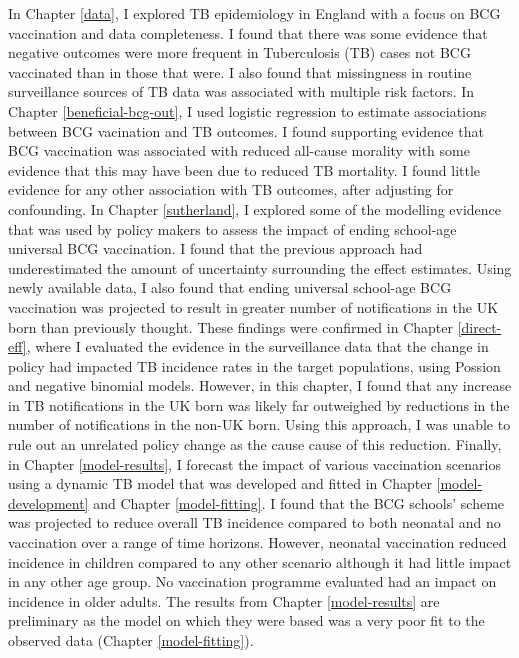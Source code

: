 \documentclass[11pt,twoside]{bristolthesis}
\begin{document}
  In Chapter \ref{data}, I explored TB epidemiology in England with a focus on BCG vaccination and data completeness. I found that there was some evidence that negative outcomes were more frequent in Tuberculosis (TB) cases not BCG vaccinated than in those that were. I also found that missingness in routine surveillance sources of TB data was associated with multiple risk factors. In Chapter \ref{beneficial-bcg-out}, I used logistic regression to estimate associations between BCG vacination and TB outcomes. I found supporting evidence that BCG vaccination was associated with reduced all-cause morality with some evidence that this may have been due to reduced TB mortality. I found little evidence for any other association with TB outcomes, after adjusting for confounding. In Chapter \ref{sutherland}, I explored some of the modelling evidence that was used by policy makers to assess the impact of ending school-age universal BCG vaccination. I found that the previous approach had underestimated the amount of uncertainty surrounding the effect estimates. Using newly available data, I also found that ending universal school-age BCG vaccination was projected to result in greater number of notifications in the UK born than previously thought. These findings were confirmed in Chapter \ref{direct-eff}, where I evaluated the evidence in the surveillance data that the change in policy had impacted TB incidence rates in the target populations, using Possion and negative binomial models. However, in this chapter, I found that any increase in TB notifications in the UK born was likely far outweighed by reductions in the number of notifications in the non-UK born. Using this approach, I was unable to rule out an unrelated policy change as the cause cause of this reduction. Finally, in Chapter \ref{model-results}, I forecast the impact of various vaccination scenarios using a dynamic TB model that was developed and fitted in Chapter \ref{model-development} and Chapter \ref{model-fitting}. I found that the BCG schools' scheme was projected to reduce overall TB incidence compared to both neonatal and no vaccination over a range of time horizons. However, neonatal vaccination reduced incidence in children compared to any other scenario although it had little impact in any other age group. No vaccination programme evaluated had an impact on incidence in older adults. The results from Chapter \ref{model-results} are preliminary as the model on which they were based was a very poor fit to the observed data (Chapter \ref{model-fitting}).
  
\end{document}
